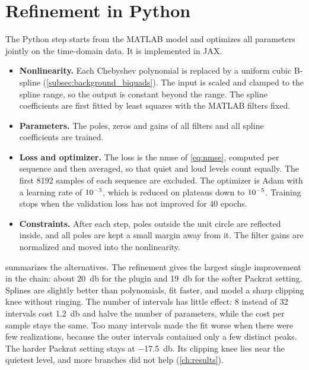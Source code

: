 \section{Refinement in Python}
\label{sec:impl_python}

The Python step starts from the MATLAB model and optimizes all parameters jointly on the time-domain data. It is implemented in JAX.
\begin{itemize}
  \item \textbf{Nonlinearity.} Each Chebyshev polynomial is replaced by a uniform cubic B-spline (\cref{subsec:background_biquads}). The input is scaled and clamped to the spline range, so the output is constant beyond the range. The spline coefficients are first fitted by least squares with the MATLAB filters fixed.
  \item \textbf{Parameters.} The poles, zeros and gains of all filters and all spline coefficients are trained.
  \item \textbf{Loss and optimizer.} The loss is the \gls{nmse} of \cref{eq:nmse}, computed per sequence and then averaged, so that quiet and loud levels count equally. The first 8192 samples of each sequence are excluded. The optimizer is Adam with a learning rate of $10\sp{-3}$, which is reduced on plateaus down to $10\sp{-5}$. Training stops when the validation loss has not improved for 40 epochs.
  \item \textbf{Constraints.} After each step, poles outside the unit circle are reflected inside, and all poles are kept a small margin away from it. The filter gains are normalized and moved into the nonlinearity.
\end{itemize}

 summarizes the alternatives. The refinement gives the largest single improvement in the chain: about \SI{20}{\decibel} for the plugin and \SI{19}{\decibel} for the softer Packrat setting. Splines are slightly better than polynomials, fit faster, and model a sharp clipping knee without ringing. The number of intervals has little effect: 8 instead of 32 intervals cost \SI{1.2}{\decibel} and halve the number of parameters, while the cost per sample stays the same. Too many intervals made the fit worse when there were few realizations, because the outer intervals contained only a few distinct peaks. The harder Packrat setting stays at \SI{-17.5}{\decibel}. Its clipping knee lies near the quietest level, and more branches did not help (\cref{ch:results}).

